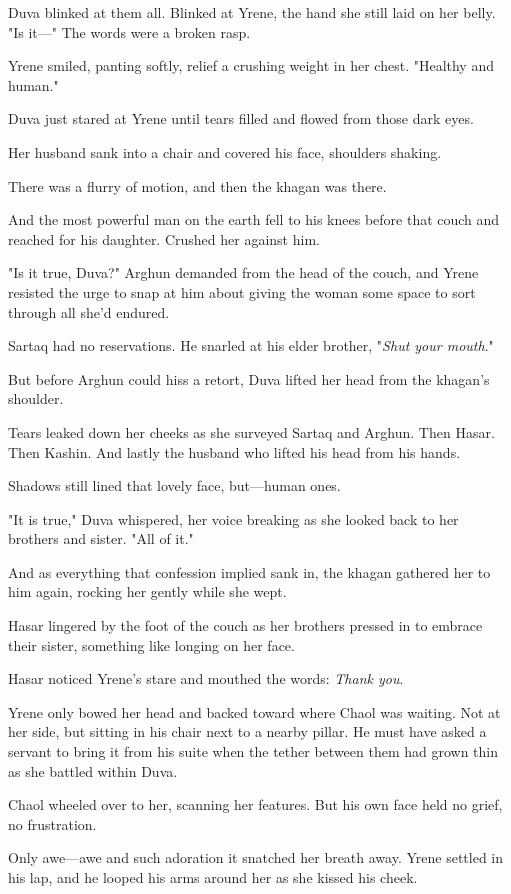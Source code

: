 Duva blinked at them all. Blinked at Yrene, the hand she still laid on her belly. "Is it---" The words were a broken rasp.

Yrene smiled, panting softly, relief a crushing weight in her chest. "Healthy and human."

Duva just stared at Yrene until tears filled and flowed from those dark eyes.

Her husband sank into a chair and covered his face, shoulders shaking.

There was a flurry of motion, and then the khagan was there.

And the most powerful man on the earth fell to his knees before that couch and reached for his daughter. Crushed her against him.

"Is it true, Duva?" Arghun demanded from the head of the couch, and Yrene resisted the urge to snap at him about giving the woman some space to sort through all she'd endured.

Sartaq had no reservations. He snarled at his elder brother, "\emph{Shut your mouth}."

But before Arghun could hiss a retort, Duva lifted her head from the khagan's shoulder.

Tears leaked down her cheeks as she surveyed Sartaq and Arghun. Then Hasar. Then Kashin. And lastly the husband who lifted his head from his hands.

Shadows still lined that lovely face, but---human ones.

"It is true," Duva whispered, her voice breaking as she looked back to her brothers and sister. "All of it."

And as everything that confession implied sank in, the khagan gathered her to him again, rocking her gently while she wept.

Hasar lingered by the foot of the couch as her brothers pressed in to embrace their sister, something like longing on her face.

Hasar noticed Yrene's stare and mouthed the words: \emph{Thank you}.

Yrene only bowed her head and backed toward where Chaol was waiting. Not at her side, but sitting in his chair next to a nearby pillar. He must have asked a servant to bring it from his suite when the tether between them had grown thin as she battled within Duva.

Chaol wheeled over to her, scanning her features. But his own face held no grief, no frustration.

Only awe---awe and such adoration it snatched her breath away. Yrene settled in his lap, and he looped his arms around her as she kissed his cheek.


